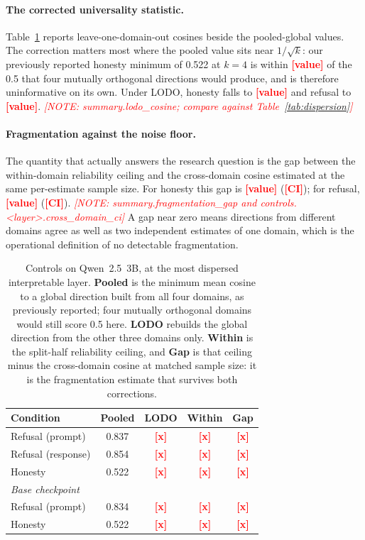\documentclass[11pt]{article}
\newcommand{\PH}[1]{\textcolor{red}{\textbf{[#1]}}}
\newcommand{\phnote}[1]{\textcolor{red}{\footnotesize\textit{[NOTE: #1]}}}
\begin{document}
\paragraph{The corrected universality statistic.}
Table~\ref{tab:controls} reports leave-one-domain-out cosines beside the
pooled-global values. The correction matters most where the pooled value sits
near $1/\sqrt{k}$: our previously reported honesty minimum of 0.522 at $k{=}4$
is within \PH{value} of the 0.5 that four mutually orthogonal directions would
produce, and is therefore uninformative on its own. Under LODO, honesty falls
to \PH{value} and refusal to \PH{value}.
\phnote{summary.lodo\_cosine; compare against Table~\ref{tab:dispersion}}

\paragraph{Fragmentation against the noise floor.}
The quantity that actually answers the research question is the gap between
the within-domain reliability ceiling and the cross-domain cosine estimated at
the same per-estimate sample size. For honesty this gap is \PH{value}
(\PH{CI}); for refusal, \PH{value} (\PH{CI}).
\phnote{summary.fragmentation\_gap and controls.<layer>.cross\_domain\_ci}
A gap near zero means directions from different domains agree as well as two
independent estimates of one domain, which is the operational definition of no
detectable fragmentation.

\begin{table}[t]
  \centering
  \small
  \begin{tabular}{lcccc}
    \toprule
    \textbf{Condition} & \textbf{Pooled} & \textbf{LODO} & \textbf{Within} & \textbf{Gap} \\
    \midrule
    Refusal (prompt)   & 0.837 & \PH{x} & \PH{x} & \PH{x} \\
    Refusal (response) & 0.854 & \PH{x} & \PH{x} & \PH{x} \\
    Honesty            & 0.522 & \PH{x} & \PH{x} & \PH{x} \\
    \midrule
    \multicolumn{5}{l}{\textit{Base checkpoint}} \\
    Refusal (prompt)   & 0.834 & \PH{x} & \PH{x} & \PH{x} \\
    Honesty            & 0.522 & \PH{x} & \PH{x} & \PH{x} \\
    \bottomrule
  \end{tabular}
  \caption{Controls on Qwen~2.5~3B, at the most dispersed interpretable layer.
  \textbf{Pooled} is the minimum mean cosine to a global direction built from
  all four domains, as previously reported; four mutually orthogonal domains
  would still score 0.5 here. \textbf{LODO} rebuilds the global direction from
  the other three domains only. \textbf{Within} is the split-half reliability
  ceiling, and \textbf{Gap} is that ceiling minus the cross-domain cosine at
  matched sample size: it is the fragmentation estimate that survives both
  corrections.}
  \label{tab:controls}
\end{table}
\end{document}

